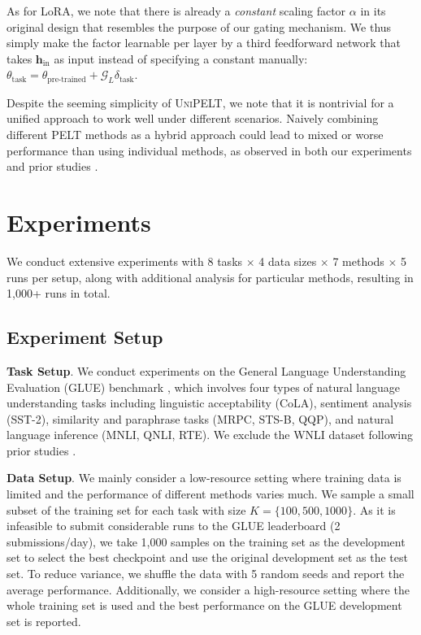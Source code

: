 As for LoRA, we note that there is already a \textit{constant} scaling factor $\alpha$ in its original design that resembles the purpose of our gating mechanism. We thus simply make the factor learnable per layer by a third feedforward network that takes ${\bm{h}}_{\text{in}}$ as input instead of specifying a constant manually: $\theta_{\text{task}} = \theta_{\text{pre-trained}} + {\mathcal{G}}_L \delta_{\text{task}}$.

Despite the seeming simplicity of \textsc{UniPELT}, we note that it is nontrivial for a unified approach to work well under different scenarios. Naively combining different PELT methods as a hybrid approach could lead to mixed or worse performance than using individual methods, as observed in both our experiments and prior studies \cite{hu2021lora}.

\section{Experiments}
We conduct extensive experiments with 8 tasks $\times$ 4 data sizes $\times$ 7 methods $\times$ 5 runs per setup, along with additional analysis for particular methods, resulting in 1,000+ runs in total.

\subsection{Experiment Setup}
{{\bf Task Setup}.} We conduct experiments on the General Language Understanding Evaluation (GLUE) benchmark \cite{wang2019glue}, which involves four types of natural language understanding tasks including linguistic acceptability (CoLA), sentiment analysis (SST-2), similarity and paraphrase tasks (MRPC, STS-B, QQP), and natural language inference (MNLI, QNLI, RTE). We exclude the WNLI dataset following prior studies \cite{houlsby2019parameter,devlin-etal-2019-bert}.

{{\bf Data Setup}.} We mainly consider a low-resource setting where training data is limited and the performance of different methods varies much. We sample a small subset of the training set for each task with size $K=\{100, 500, 1000 \}$.
As it is infeasible to submit considerable runs to the GLUE leaderboard (2 submissions/day), we take 1,000 samples on the training set as the development set to select the best checkpoint and use the original development set as the test set. To reduce variance, we shuffle the data with 5 random seeds and report the average performance. Additionally, we consider a high-resource setting where the whole training set is used and the best performance on the GLUE development set is reported.

